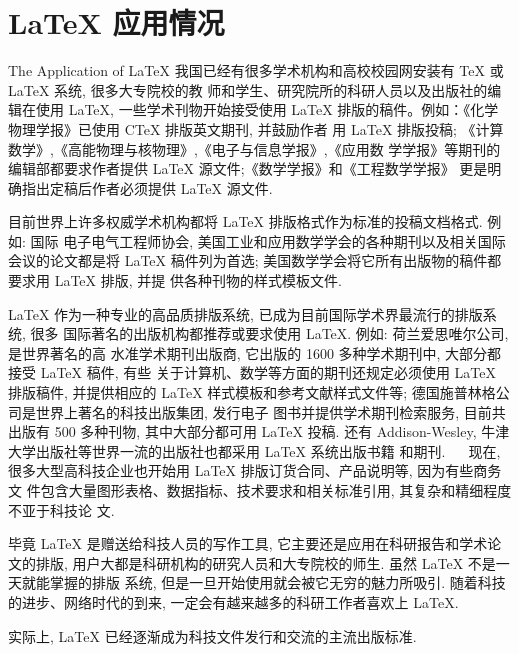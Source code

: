 
\chapter{\LaTeX{}\index{\LaTeX} 应用情况}{The Application of \LaTeX}
我国已经有很多学术机构和高校校园网安装有 \TeX{}\index{\TeX} 或 \LaTeX{}\index{\LaTeX} 系统, 很多大专院校的教
师和学生、研究院所的科研人员以及出版社的编辑在使用 \LaTeX\index{\LaTeX}, 一些学术刊物开始接受使用
\LaTeX{}\index{\LaTeX} 排版的稿件。例如：《化学物理学报》已使用 C\TeX{} 排版英文期刊, 并鼓励作者
用 \LaTeX{}\index{\LaTeX} 排版投稿; 《计算数学》,《高能物理与核物理》,《电子与信息学报》,《应用数
学学报》等期刊的编辑部都要求作者提供 \LaTeX{}\index{\LaTeX} 源文件;《数学学报》和《工程数学学报》
更是明确指出定稿后作者必须提供 \LaTeX{}\index{\LaTeX} 源文件.

目前世界上许多权威学术机构都将 \LaTeX{}\index{\LaTeX} 排版格式作为标准的投稿文档格式. 例如: 国际
电子电气工程师协会, 美国工业和应用数学学会的各种期刊以及相关国际会议的论文都是将
\LaTeX{}\index{\LaTeX} 稿件列为首选; 美国数学学会将它所有出版物的稿件都要求用 \LaTeX{}\index{\LaTeX} 排版, 并提
供各种刊物的样式模板文件.

\LaTeX{}\index{\LaTeX} 作为一种专业的高品质排版系统, 已成为目前国际学术界最流行的排版系统, 很多
国际著名的出版机构都推荐或要求使用 \LaTeX\index{\LaTeX}. 例如: 荷兰爱思唯尔公司, 是世界著名的高
水准学术期刊出版商, 它出版的 1600 多种学术期刊中, 大部分都接受 \LaTeX{}\index{\LaTeX} 稿件, 有些
关于计算机、数学等方面的期刊还规定必须使用 \LaTeX{}\index{\LaTeX} 排版稿件, 并提供相应的 \LaTeX{}\index{\LaTeX}
样式模板和参考文献样式文件等; 德国施普林格公司是世界上著名的科技出版集团, 发行电子
图书并提供学术期刊检索服务, 目前共出版有 500 多种刊物, 其中大部分都可用 \LaTeX{}\index{\LaTeX} 投稿.
还有 Addison-Wesley, 牛津大学出版社等世界一流的出版社也都采用 \LaTeX{}\index{\LaTeX} 系统出版书籍
和期刊.
　
现在, 很多大型高科技企业也开始用 \LaTeX{}\index{\LaTeX} 排版订货合同、产品说明等, 因为有些商务文
件包含大量图形表格、数据指标、技术要求和相关标准引用, 其复杂和精细程度不亚于科技论
文.

毕竟 \LaTeX{}\index{\LaTeX} 是赠送给科技人员的写作工具, 它主要还是应用在科研报告和学术论文的排版,
用户大都是科研机构的研究人员和大专院校的师生. 虽然 \LaTeX{}\index{\LaTeX} 不是一天就能掌握的排版
系统, 但是一旦开始使用就会被它无穷的魅力所吸引. 随着科技的进步、网络时代的到来,
一定会有越来越多的科研工作者喜欢上 \LaTeX\index{\LaTeX}.

实际上, \LaTeX{}\index{\LaTeX} 已经逐渐成为科技文件发行和交流的主流出版标准.
